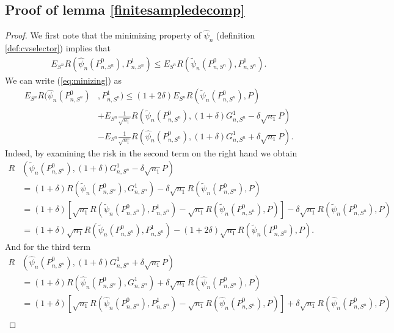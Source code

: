 \documentclass[11pt, a4paper]{article}
\theoremstyle{definition}
\theoremstyle{remark}
\newcommand{\la}{\psi}
\newcommand{\Sn}{S^n}
\begin{document}
\subsection{Proof of lemma \ref{finitesampledecomp}}
\begin{proof}
    We first note that the minimizing property of $ \hat{\la}_n $ (definition \ref{def:cvselector}) implies that 
    \begin{align}
        E_{\Sn} R( \hat{\la}_n(P_{n, \Sn}^{0}), P_{n, \Sn}^{1} ) \leq E_{\Sn} R( \tilde{\la}_n(P_{n, \Sn}^{0}) , P_{n, \Sn}^{1}  ). \label{eq:minizing} 
    \end{align}
    We can write (\ref{eq:minizing}) as  
   \begin{align*}
       E_{\Sn} R( \hat{\la}_n(P_{n, \Sn}^{0} )&, P_{n, \Sn}^{1}) \leq (1 + 2 \delta) E_{\Sn} R( \tilde{\la}_n(P_{n, \Sn}^{0}) , P ) \\ 
               &+E_{\Sn} \frac{1}{\sqrt{n_1} } R(\tilde{\la}_n (P_{n, \Sn}^{0}), (1 + \delta) G_{n,\Sn}^{1} - \delta \sqrt{n_1} P)\\
               &-E_{\Sn} \frac{1}{\sqrt{n_1} } R(\hat{\la}_n(P_{n, \Sn}^{0}), (1 + \delta) G_{n,\Sn}^{1} + \delta \sqrt{n_1} P)  .
   \end{align*}
  Indeed, by examining the risk in the second term on the right hand we obtain 
  \begin{align*}
      R&(\tilde{\la}_n (P_{n, \Sn}^{0}), (1 + \delta) G_{n,\Sn}^{1} - \delta \sqrt{n_1} P)\\
                    &= (1 + \delta) R(\tilde{\la}_n (P_{n, \Sn}^{0}), G_{n,\Sn}^{1}) - \delta \sqrt{n_1} R(\tilde{\la}_n (P_{n, \Sn}^{0}), P) \\ 
                    &= (1 + \delta) \left[\sqrt{n_1} R(\tilde{\la}_n (P_{n, \Sn}^{0}), P_{n,\Sn}^{1}) - \sqrt{n_1} R(\tilde{\la}_n (P_{n, \Sn}^{0}), P)\right] - \delta \sqrt{n_1} R(\tilde{\la}_n (P_{n, \Sn}^{0}), P)\\ 
                    &= (1 + \delta) \sqrt{n_1} R(\tilde{\la}_n (P_{n, \Sn}^{0}), P_{n,\Sn}^{1}) - (1 + 2\delta)\sqrt{n_1}   R(\tilde{\la}_n (P_{n, \Sn}^{0}), P).
  \end{align*}
  And for the third term 
  \begin{align*}
     R&(\hat{\la}_n(P_{n, \Sn}^{0}), (1 + \delta) G_{n,\Sn}^{1} + \delta \sqrt{n_1} P)\\
       &= (1 + \delta) R(\hat{\la}_n (P_{n, \Sn}^{0}), G_{n,\Sn}^{1}) + \delta \sqrt{n_1} R(\hat{\la}_n (P_{n, \Sn}^{0}), P) \\ 
       &= (1 + \delta) \left[\sqrt{n_1} R(\hat{\la}_n (P_{n, \Sn}^{0}), P_{n,\Sn}^{1}) - \sqrt{n_1} R(\hat{\la}_n (P_{n, \Sn}^{0}), P)\right] + \delta \sqrt{n_1} R(\hat{\la}_n (P_{n, \Sn}^{0}), P)\\ 

\end{align*}
\end{proof}
\end{document}
